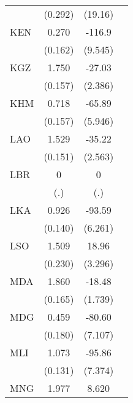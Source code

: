 \begin{table}[htbp]
\begin{tabular}{l*{3}{c}}
                &  (0.292)         &  (19.16)         &                  \\
\addlinespace
KEN             &    0.270\sym{+}  &   -116.9\sym{***}&                  \\
                &  (0.162)         &  (9.545)         &                  \\
\addlinespace
KGZ             &    1.750\sym{***}&   -27.03\sym{***}&                  \\
                &  (0.157)         &  (2.386)         &                  \\
\addlinespace
KHM             &    0.718\sym{***}&   -65.89\sym{***}&                  \\
                &  (0.157)         &  (5.946)         &                  \\
\addlinespace
LAO             &    1.529\sym{***}&   -35.22\sym{***}&                  \\
                &  (0.151)         &  (2.563)         &                  \\
\addlinespace
LBR             &        0         &        0         &                  \\
                &      (.)         &      (.)         &                  \\
\addlinespace
LKA             &    0.926\sym{***}&   -93.59\sym{***}&                  \\
                &  (0.140)         &  (6.261)         &                  \\
\addlinespace
LSO             &    1.509\sym{***}&    18.96\sym{***}&                  \\
                &  (0.230)         &  (3.296)         &                  \\
\addlinespace
MDA             &    1.860\sym{***}&   -18.48\sym{***}&                  \\
                &  (0.165)         &  (1.739)         &                  \\
\addlinespace
MDG             &    0.459\sym{*}  &   -80.60\sym{***}&                  \\
                &  (0.180)         &  (7.107)         &                  \\
\addlinespace
MLI             &    1.073\sym{***}&   -95.86\sym{***}&                  \\
                &  (0.131)         &  (7.374)         &                  \\
\addlinespace
MNG             &    1.977\sym{***}&    8.620\sym{***}&                  \\

\end{tabular}
\end{table}
